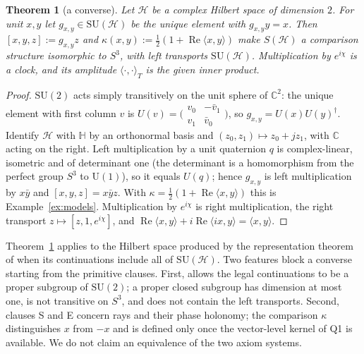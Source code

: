 \documentclass[aps,pra,onecolumn,superscriptaddress,nofootinbib,10pt]{revtex4-2}
\newtheorem{theorem}{Theorem}
\theoremstyle{definition}
\theoremstyle{remark}
\newcommand{\C}{\mathbb{C}}
\newcommand{\HH}{\mathbb{H}}
\newcommand{\re}{\operatorname{Re}}
\newcommand{\ip}[2]{\langle #1,#2\rangle}
\newcommand{\hp}[3]{[#1,#2,#3]}
\newcommand{\SU}{\mathrm{SU}}
\newcommand{\U}{\mathrm{U}}
\begin{document}
\begin{theorem}[a converse]\label{thm:converse}
Let $\mathcal H$ be a complex Hilbert space of dimension $2$.  For unit $x,y$ let $g_{x,y}\in\SU(\mathcal H)$ be
the unique element with $g_{x,y}y=x$.  Then $\hp{x}{y}{z}:=g_{x,y}z$ and
$\kappa(x,y):=\tfrac12(1+\re\ip{x}{y})$ make $S(\mathcal H)$ a comparison structure isomorphic to $S^3$,
with left transports $\SU(\mathcal H)$.  Multiplication by $e^{i\chi}$ is a clock, and its amplitude
$\ip{\cdot}{\cdot}_T$ is the given inner product.
\end{theorem}
\begin{proof}
$\SU(2)$ acts simply transitively on the unit sphere of $\C^2$: the unique element with first column
$v$ is $U(v)=\bigl(\begin{smallmatrix}v_0&-\bar v_1\\v_1&\bar v_0\end{smallmatrix}\bigr)$, so
$g_{x,y}=U(x)U(y)^\dagger$.  Identify $\mathcal H$ with $\HH$ by an orthonormal basis and
$(z_0,z_1)\mapsto z_0+jz_1$, with $\C$ acting on the right.  Left multiplication by a unit quaternion
$q$ is complex-linear, isometric and of determinant one (the determinant is a homomorphism from the
perfect group $S^3$ to $\U(1)$), so it equals $U(q)$; hence $g_{x,y}$ is left multiplication by $x\bar y$
and $\hp{x}{y}{z}=x\bar yz$.  With $\kappa=\frac12(1+\re\ip{x}{y})$ this is Example~\ref{ex:models}.
Multiplication by $e^{i\chi}$ is right multiplication, the right transport $z\mapsto\hp{z}{1}{e^{i\chi}}$, and
$\re\ip{x}{y}+i\re\ip{ix}{y}=\ip{x}{y}$.
\end{proof}

Theorem~\ref{thm:converse} applies to the Hilbert space produced by the representation theorem of
\cite{CRQO} when its continuations include all of $\SU(\mathcal H)$.  Two features block a converse
starting from the primitive clauses.  First, \cite{CRQO} allows the legal continuations to be a proper
subgroup of $\SU(2)$; a proper closed subgroup has dimension at most one, is not transitive on $S^3$,
and does not contain the left transports.  Second, clauses S and E concern rays and their phase
holonomy; the comparison $\kappa$ distinguishes $x$ from $-x$ and is defined only once the vector-level
kernel of \textsf{Q1} is available.  We do not claim an equivalence of the two axiom systems.
\end{document}

